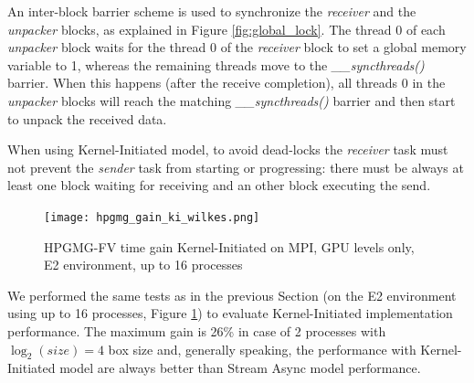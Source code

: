\documentclass[review]{siamart1116}
\begin{document}
An inter-block barrier scheme is used to synchronize the \textit{receiver}
and the \textit{unpacker} blocks, as explained in Figure
\ref{fig:global_lock}. The thread 0 of each \textit{unpacker}
block waits for the thread 0 of the
\textit{receiver} block to set a global memory variable to 1, whereas the
remaining threads move to the \textit{\_\_syncthreads()} barrier.
%
When this happens (after the receive completion), all threads 0 in the
\textit{unpacker} blocks will reach the matching \textit{\_\_syncthreads()}
barrier and then start to unpack the received data.







When using Kernel-Initiated model, to avoid dead-locks the \textit{receiver}
task must not prevent the \textit{sender} task from starting or
progressing: there must be always at least one block waiting for receiving and an other block executing the send.

\begin{figure}[h]
\centering
\texttt{[image: hpgmg\_gain\_ki\_wilkes.png]}
\caption{HPGMG-FV time gain Kernel-Initiated on MPI, GPU levels only, E2 environment, up to 16 processes}
\label{fig:hpgmg_gain_ki_wilkes}
\end{figure}

We performed the same tests as in the previous Section (on the E2 environment using up to 16 processes, Figure \ref{fig:hpgmg_gain_ki_wilkes}) to evaluate Kernel-Initiated implementation performance. The maximum gain is 26\% in case of 2 processes with $\log_2(size)=4$ box size and, generally speaking, the performance with Kernel-Initiated model are always better than Stream Async model performance.\\

\end{document}
